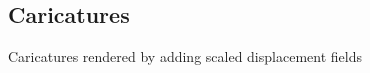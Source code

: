 \begin{figure}[h!]
    \subfloat[distance]{}

    \subfloat[distance]{}

    \subfloat[distance]{}
    \caption{}
\label{fig:distmap}
\end{figure}

\begin{figure}[h!]
    \subfloat[target]{}
    \subfloat[distance]{}
    \caption{}
\label{fig:distmap}
\end{figure}

\subsection{Caricatures}
Caricatures rendered by adding scaled displacement fields

